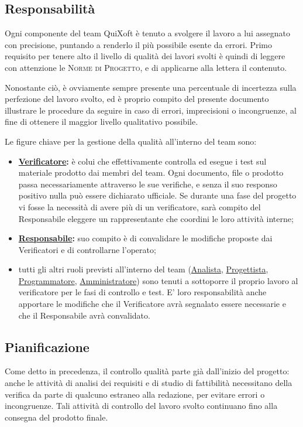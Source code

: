 \documentclass[11pt,a4paper]{article}
\begin{document}
\subsection{Responsabilità}
Ogni componente del team QuiXoft è tenuto a svolgere il lavoro a lui assegnato con precisione, puntando a renderlo il più possibile esente da errori.
Primo requisito per tenere alto il livello di qualità dei lavori svolti è quindi di leggere con attenzione le \textsc{Norme di Progetto}, e di applicarne alla lettera il contenuto.

Nonostante ciò, è ovviamente sempre presente una percentuale di incertezza sulla perfezione del lavoro svolto, ed è proprio compito del presente documento illustrare le procedure da seguire in caso di errori, imprecisioni o incongruenze, al fine di ottenere il maggior livello qualitativo possibile.

Le figure chiave per la gestione della qualità all'interno del team sono:
\begin{itemize}
	\item \textbf{\underline{Verificatore}:} è colui che effettivamente controlla ed esegue i test sul materiale prodotto dai membri del team. Ogni documento, file o prodotto passa necessariamente attraverso le sue verifiche, e senza il suo responso positivo nulla può essere dichiarato ufficiale. Se durante una fase del progetto vi fosse la necessità di avere più di un verificatore, sarà compito del Responsabile eleggere un rappresentante che coordini le loro attività interne;
	\item \textbf{\underline{Responsabile}:} suo compito è di convalidare le modifiche proposte dai Verificatori e di controllarne l'operato;
	\item tutti gli altri ruoli previsti all'interno del team (\underline{Analista}, \underline{Progettista}, \underline{Programmatore}, \underline{Amministratore}) sono tenuti a sottoporre il proprio lavoro al verificatore per le fasi di controllo e test. E' loro responsabilità anche apportare le modifiche che il Verificatore avrà segnalato essere necessarie e che il Responsabile avrà convalidato.
\end{itemize}
\subsection{Pianificazione}
Come detto in precedenza, il controllo qualità parte già dall'inizio del progetto: anche le attività di analisi dei requisiti e di studio di fattibilità necessitano della verifica da parte di qualcuno estraneo alla redazione, per evitare errori o incongruenze.
Tali attività di controllo del lavoro svolto continuano fino alla consegna del prodotto finale.
\end{document}
